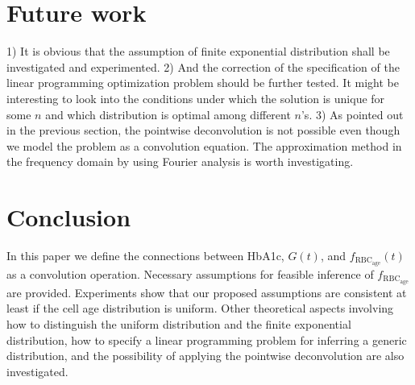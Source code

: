 \documentclass{article}
\newcommand{\hba}{\textrm{HbA1c}}
\newcommand{\f}{f_{\mathrm{RBC}_{\mathrm{age}}}}
\begin{document}
\section{Future work}

1) It is obvious that the assumption of finite exponential distribution shall be investigated and experimented. 2) And the correction of the specification of the linear programming optimization problem should be further tested. It might be interesting to look into the conditions under which the solution is unique for some $n$ and which distribution is optimal among different $n$'s. 3) As pointed out in the previous section, the pointwise deconvolution is not possible even though we model the problem as a convolution equation. The approximation method in the frequency domain by using Fourier analysis is worth investigating.

\section{Conclusion}
In this paper we define the connections between \hba, $G(t)$, and $\f(t)$ as a convolution operation. Necessary assumptions for feasible inference of $\f$ are provided. Experiments show that our proposed assumptions are consistent at least if the cell age distribution is uniform. Other theoretical aspects involving how to distinguish the uniform distribution and the finite exponential distribution, how to specify a linear programming problem for inferring a generic distribution, and the possibility of applying the pointwise deconvolution are also investigated.










\end{document}
